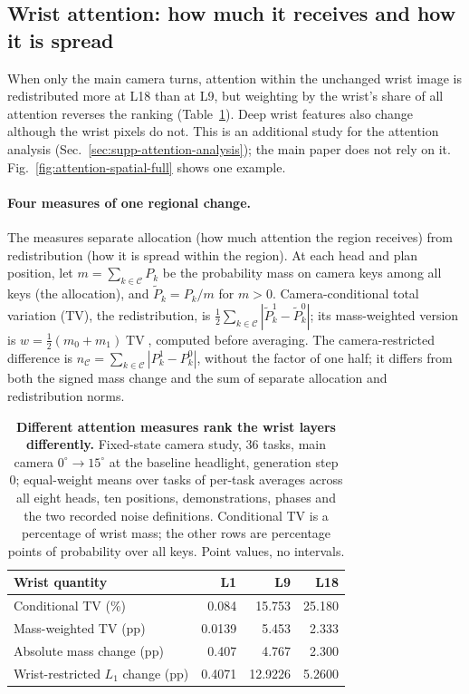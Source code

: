 \subsection{Wrist attention: how much it receives and how it is spread}
\label{supp:legacy-attention}
When only the main camera turns, attention within the unchanged wrist image is redistributed more at L18 than at L9, but weighting by the wrist's share of all attention reverses the ranking (Table~\ref{tab:legacy-attention}). Deep wrist features also change although the wrist pixels do not. This is an additional study for the attention analysis (Sec.~\ref{sec:supp-attention-analysis}); the main paper does not rely on it. Fig.~\ref{fig:attention-spatial-full} shows one example.

\paragraph{Four measures of one regional change.}
The measures separate allocation (how much attention the region receives) from redistribution (how it is spread within the region). At each head and plan position, let $m=\sum_{k\in\mathcal C}P_k$ be the probability mass on camera keys among all keys (the allocation), and $\widetilde P_k=P_k/m$ for $m>0$. Camera-conditional total variation (TV), the redistribution, is $\frac12\sum_{k\in\mathcal C}|\widetilde P_k^1-\widetilde P_k^0|$; its mass-weighted version is $w=\frac12(m_0+m_1)\operatorname{TV}$, computed before averaging. The camera-restricted difference is $n_{\mathcal C}=\sum_{k\in\mathcal C}|P_k^1-P_k^0|$, without the factor of one half; it differs from both the signed mass change and the sum of separate allocation and redistribution norms.

\begin{table}[t]\centering\small
\caption{\textbf{Different attention measures rank the wrist layers differently.} Fixed-state camera study, 36 tasks, main camera $0^\circ\!\rightarrow15^\circ$ at the baseline headlight, generation step 0; equal-weight means over tasks of per-task averages across all eight heads, ten positions, demonstrations, phases and the two recorded noise definitions. Conditional TV is a percentage of wrist mass; the other rows are percentage points of probability over all keys. Point values, no intervals.}
\label{tab:legacy-attention}
\setlength{\tabcolsep}{3pt}
\begin{tabular}{lrrr}\toprule
Wrist quantity & L1 & L9 & L18\\\midrule
Conditional TV (\%) & 0.084 & 15.753 & 25.180\\
Mass-weighted TV (pp) & 0.0139 & 5.453 & 2.333\\
Absolute mass change (pp) & 0.407 & 4.767 & 2.300\\
Wrist-restricted $L_1$ change (pp) & 0.4071 & 12.9226 & 5.2600\\\bottomrule
\end{tabular}\end{table}

